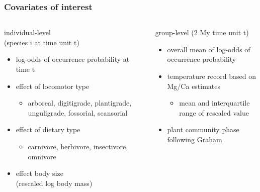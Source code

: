 \documentclass{beamer}
\begin{document}
\begin{frame}
  \frametitle{Covariates of interest}
  \begin{columns}
    \begin{column}{0.5\textwidth}
      individual-level \\(species i at time unit t)
      \begin{itemize}
        \item log-odds of occurrence probability at time t
        \item effect of locomotor type
          \begin{itemize}
            \item arboreal, digitigrade, plantigrade, unguligrade, fossorial, scansorial
          \end{itemize}
        \item effect of dietary type
          \begin{itemize}
            \item carnivore, herbivore, insectivore, omnivore
          \end{itemize}
        \item effect body size \\(rescaled log body mass)
      \end{itemize}
    \end{column}
    \begin{column}{0.5\textwidth}
      group-level (2 My time unit t)
      \begin{itemize}
        \item overall mean of log-odds of occurrence probability
        \item temperature record based on Mg/Ca estimates
          \begin{itemize}
            \item mean and interquartile range of rescaled value
          \end{itemize}
        \item plant community phase following Graham
      \end{itemize}
    \end{column}
  \end{columns}
\end{frame}
\end{document}
